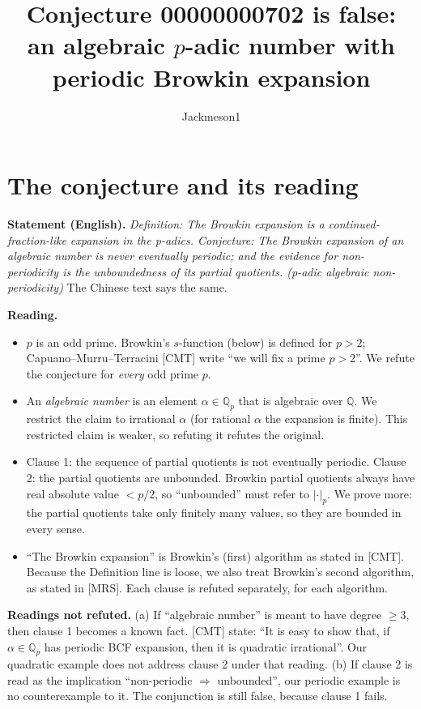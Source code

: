 \documentclass[11pt]{article}
\title{Conjecture 00000000702 is false:\\ an algebraic $p$-adic number with periodic Browkin expansion}
\author{Jackmeson1}
\date{}
\theoremstyle{definition}
\newcommand{\Q}{\mathbb{Q}}
\begin{document}
\maketitle

\section{The conjecture and its reading}

\textbf{Statement (English).} \emph{Definition: The Browkin expansion is a continued-fraction-like
expansion in the p-adics. Conjecture: The Browkin expansion of an algebraic number is never
eventually periodic; and the evidence for non-periodicity is the unboundedness of its partial
quotients. (p-adic algebraic non-periodicity)} The Chinese text says the same.

\textbf{Reading.}
\begin{itemize}
\item $p$ is an odd prime. Browkin's $s$-function (below) is defined for $p>2$; Capuano--Murru--Terracini
  [CMT] write ``we will fix a prime $p>2$''. We refute the conjecture for \emph{every} odd prime $p$.
\item An \emph{algebraic number} is an element $\alpha\in\Q_p$ that is algebraic over $\Q$. We restrict the
  claim to irrational $\alpha$ (for rational $\alpha$ the expansion is finite). This restricted claim is
  weaker, so refuting it refutes the original.
\item Clause 1: the sequence of partial quotients is not eventually periodic.
  Clause 2: the partial quotients are unbounded. Browkin partial quotients always have real absolute value
  $<p/2$, so ``unbounded'' must refer to $|\cdot|_p$. We prove more: the partial quotients take only
  finitely many values, so they are bounded in every sense.
\item ``The Browkin expansion'' is Browkin's (first) algorithm as stated in [CMT]. Because the Definition line
  is loose, we also treat Browkin's second algorithm, as stated in [MRS]. Each clause is refuted separately,
  for each algorithm.
\end{itemize}

\textbf{Readings not refuted.}
(a) If ``algebraic number'' is meant to have degree $\ge 3$, then clause 1 becomes a known fact. [CMT] state:
``It is easy to show that, if $\alpha\in\Q_p$ has periodic BCF expansion, then it is quadratic
irrational''. Our quadratic example does not address clause 2 under that reading.
(b) If clause 2 is read as the implication ``non-periodic $\Rightarrow$ unbounded'', our periodic example is no
counterexample to it. The conjunction is still false, because clause 1 fails.
\end{document}
